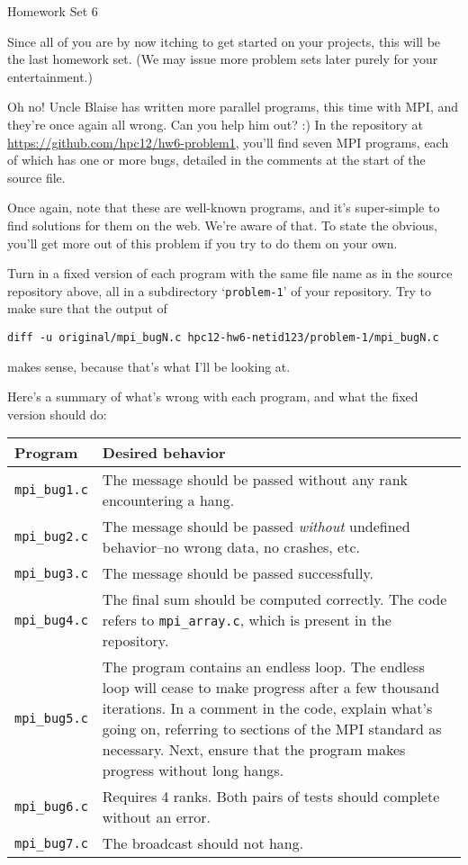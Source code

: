 \documentclass[11pt]{article}
\begin{document}
%
{Homework Set 6}

Since all of you are by now itching to get started on your projects,
this will be the last homework set. (We may issue more problem sets
later purely for your entertainment.)

\bigskip
{}

Oh no! Uncle Blaise has written more parallel programs, this time
with MPI, and they're once again all wrong. Can you help him out? :)
In the repository at \url{https://github.com/hpc12/hw6-problem1},
you'll find seven MPI programs, each of which has one or more bugs,
detailed in the comments at the start of the source file.

Once again, note that these are well-known programs, and it's
super-simple to find solutions for them on the web. We're aware of
that. To state the obvious, you'll get more out of this problem if you
try to do them on your own.

Turn in a fixed version of each program with the same file name as in
the source repository above, all in a subdirectory `\texttt{problem-1}'
of your repository. Try to make sure that the output of
\begin{lstlisting}
diff -u original/mpi_bugN.c hpc12-hw6-netid123/problem-1/mpi_bugN.c
\end{lstlisting}
makes sense, because that's what I'll be looking at.

Here's a summary of what's wrong with each program, and what the fixed
version should do:

\begin{tabular}{|l|p{13.5cm}|}
  \hline
  \textbf{Program} & \textbf{Desired behavior} \\
  \hline
  \texttt{mpi\_bug1.c} & The message should be passed without any rank
  encountering a hang. \\
  \texttt{mpi\_bug2.c} & The message should be passed \emph{without}
  undefined behavior--no wrong data, no crashes, etc. \\
  \texttt{mpi\_bug3.c} & The message should be passed successfully. \\
  \texttt{mpi\_bug4.c} & The final sum should be computed correctly.
  The code refers to \texttt{mpi\_array.c}, which is present in the
  repository.\\
  \texttt{mpi\_bug5.c} & The program contains an endless loop.
  The endless loop will cease to make progress after a few thousand
  iterations. In a comment in the code, explain what's going on,
  referring to sections of the MPI standard as necessary. Next, ensure
  that the program makes progress without long hangs. \\
  \texttt{mpi\_bug6.c} & Requires 4 ranks. Both pairs of tests
  should complete without an error. \\
  \texttt{mpi\_bug7.c} & The broadcast should not hang. \\
  \hline
\end{tabular}
\end{document}
